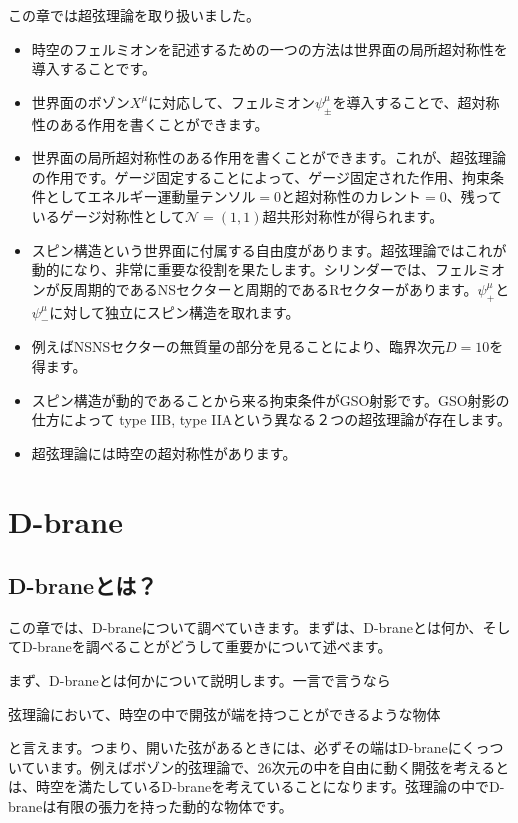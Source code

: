 \documentclass[report,paper=a4, fontsize=12pt, line_length=16cm, number_of_lines=33,dvipdfmx]{jlreq}
\newenvironment{important}{\begin{tcolorbox}[
  colback = white,
  colframe = red!35,
  boxrule = 2mm,
  fonttitle = \bfseries,
  after = \noindent] }{\end{tcolorbox}}
\numberwithin{equation}{chapter}
\numberwithin{equation}{section}
\newcommand{\Ncal}{\mathcal{N}}
\begin{document}
この章では超弦理論を取り扱いました。
\begin{itemize}
  \item 時空のフェルミオンを記述するための一つの方法は世界面の局所超対称性を導入することです。
  \item 世界面のボゾン$X^{\mu}$に対応して、フェルミオン$\psi_{\pm}^{\mu}$を導入することで、超対称性のある作用を書くことができます。
  \item 世界面の局所超対称性のある作用を書くことができます。これが、超弦理論の作用です。ゲージ固定することによって、ゲージ固定された作用、拘束条件としてエネルギー運動量テンソル$=0$と超対称性のカレント$=0$、残っているゲージ対称性として$\Ncal=(1,1)$超共形対称性が得られます。
  \item スピン構造という世界面に付属する自由度があります。超弦理論ではこれが動的になり、非常に重要な役割を果たします。シリンダーでは、フェルミオンが反周期的であるNSセクターと周期的であるRセクターがあります。$\psi^{\mu}_{+}$と$\psi^{\mu}_{-}$に対して独立にスピン構造を取れます。
  \item 例えばNSNSセクターの無質量の部分を見ることにより、臨界次元$D=10$を得ます。
  \item スピン構造が動的であることから来る拘束条件がGSO射影です。GSO射影の仕方によって type IIB, type IIAという異なる２つの超弦理論が存在します。
  \item 超弦理論には時空の超対称性があります。
\end{itemize}


\chapter{D-brane}

\section{D-braneとは？}

この章では、D-braneについて調べていきます。まずは、D-braneとは何か、そしてD-braneを調べることがどうして重要かについて述べます。

まず、D-braneとは何かについて説明します。一言で言うなら
\begin{important}
  弦理論において、時空の中で開弦が端を持つことができるような物体
\end{important}
と言えます。つまり、開いた弦があるときには、必ずその端はD-braneにくっついています。例えばボゾン的弦理論で、26次元の中を自由に動く開弦を考えるとは、時空を満たしているD-braneを考えていることになります。弦理論の中でD-braneは有限の張力を持った動的な物体です。
\end{document}
